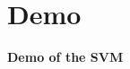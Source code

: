 \documentclass{beamer}
\begin{document}
\section{Demo}

\begin{frame}
\tableofcontents[currentsection]
\end{frame}

\begin{frame}

\bigskip

\bigskip

\begin{center}
\textbf{Demo of the SVM}
\end{center}

\end{frame}
\end{document}
